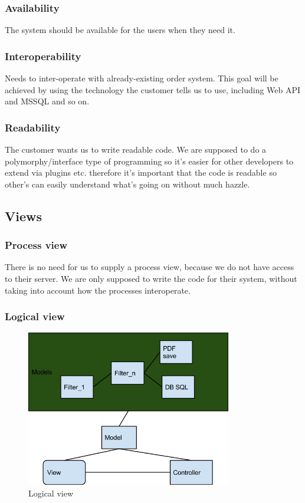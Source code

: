 \subsubsection{Availability}
The system should be available for the users when they need it.
\subsubsection{Interoperability}
Needs to inter-operate with already-existing order system. This goal will be achieved by using the technology the customer tells us to use, including Web API and MSSQL and so on.
\subsubsection{Readability}
The customer wants us to write readable code. We are supposed to do a polymorphy/interface type of programming so it's easier for other developers to extend via plugins etc. therefore it's important that the code is readable so other's can easily understand what's going on without much hazzle.

\subsection{Views}


\subsubsection{Process view}
There is no need for us to supply a process view, because we do not have access to their server. We are only supposed to write the code for their system, without taking into account how the processes interoperate.
\subsubsection{Logical view}
\begin{figure}[h]
\centering
\includegraphics[width=0.8\textwidth]{images/architecture00.png}
\caption{Logical view}
\label{fig:logical_view}
\end{figure}
\newpage

